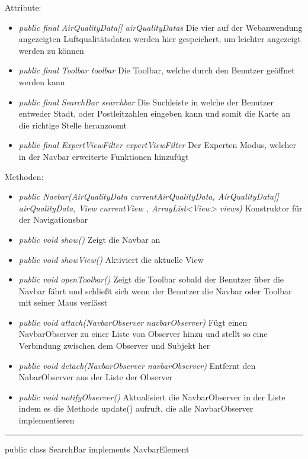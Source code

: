 Attribute:
\begin{itemize}
    \item \emph{public final AirQualityData[] airQualityDatas} Die vier auf der Webanwendung angezeigten Luftqualitätsdaten werden hier gespeichert, um leichter angezeigt werden zu können
    \item \emph{public final Toolbar toolbar} Die Toolbar, welche durch den Benutzer geöffnet werden kann
    \item \emph{public final SearchBar searchbar} Die Suchleiste in welche der Benutzer entweder Stadt, oder Postleitzahlen eingeben kann und somit die Karte an die richtige Stelle heranzoomt
    \item \emph{public final ExpertViewFilter expertViewFilter} Der Experten Modus, welcher in der Navbar erweiterte Funktionen hinzufügt

\end{itemize}
Methoden:
\begin{itemize}
    \item \emph{public Navbar(AirQualityData currentAirQualityData, AirQualityData[] airQualityData, View currentView , ArrayList<View> views)} Konstruktor für der Navigationsbar
    \item \emph{public void show()} Zeigt die Navbar an
    \item \emph{public void showView()} Aktiviert die aktuelle View
    \item \emph{public void openToolbar()} Zeigt die Toolbar sobald der Benutzer über die Navbar fährt und schließt sich wenn der Benutzer die Navbar oder Toolbar mit seiner Maus verlässt
    \item \emph{public void attach(NavbarObserver navbarObserver)} Fügt einen NavbarObserver zu einer Liste von Observer hinzu und stellt so eine Verbindung zwischen dem Observer und Subjekt her
    \item \emph{public void detach(NavbarObserver navbarObserver)} Entfernt den NabarObserver aus der Liste der Observer
    \item \emph{public void notifyObserver()} Aktualisiert die NavbarObserver in der Liste indem es die Methode update() aufruft, die alle NavbarObserver implementieren
\end{itemize}

\rule{\textwidth}{0.4pt}
public class SearchBar implements NavbarElement

